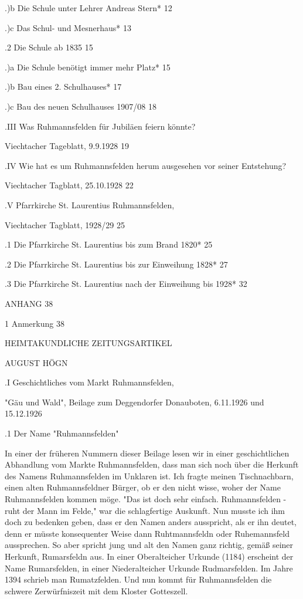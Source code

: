 \documentclass{book}
\begin{document}
.)b Die Schule unter Lehrer Andreas Stern*  12

.)c Das Schul- und Mesnerhaus*  13

.2 Die Schule ab 1835   15

.)a Die Schule benötigt immer mehr Platz*   15

.)b Bau eines 2. Schulhauses*   17

.)c Bau des neuen Schulhauses 1907/08   18

.III Was Ruhmannsfelden für Jubiläen feiern könnte?

Viechtacher Tageblatt, 9.9.1928 19

.IV Wie hat es um Ruhmannsfelden herum ausgesehen vor seiner Entstehung?

Viechtacher Tagblatt, 25.10.1928    22

.V Pfarrkirche St. Laurentius Ruhmannsfelden,

Viechtacher Tagblatt, 1928/29   25

.1 Die Pfarrkirche St. Laurentius bis zum Brand 1820*   25

.2 Die Pfarrkirche St. Laurentius bis zur Einweihung 1828*  27

.3 Die Pfarrkirche St. Laurentius nach der Einweihung bis 1928* 32

ANHANG  38

1 Anmerkung 38



HEIMTAKUNDLICHE ZEITUNGSARTIKEL

AUGUST HÖGN

.I Geschichtliches vom Markt Ruhmannsfelden,

"Gäu und Wald", Beilage zum Deggendorfer Donauboten, 6.11.1926 und 15.12.1926

.1 Der Name "Ruhmannsfelden"

In einer der früheren Nummern dieser Beilage lesen wir in einer geschichtlichen
Abhandlung vom Markte Ruhmannsfelden, dass man sich noch über die Herkunft des
Namens Ruhmannsfelden im Unklaren ist. Ich fragte meinen Tischnachbarn, einen
alten Ruhmannsfeldner Bürger, ob er den nicht wisse, woher der Name
Ruhmannsfelden kommen möge. "Das ist doch sehr einfach. Ruhmannsfelden - ruht
der Mann im Felde," war die schlagfertige Auskunft. Nun musste ich ihm doch zu
bedenken geben, dass er den Namen anders ausspricht, als er ihn deutet, denn er
müsste konsequenter Weise dann Ruhtmannsfeldn oder Ruhemannsfeld aussprechen. So
aber spricht jung und alt den Namen ganz richtig, gemäß seiner Herkunft,
Rumarsfeldn aus. In einer Oberalteicher Urkunde (1184) erscheint der Name
Rumarsfelden, in einer Niederalteicher Urkunde Rudmarsfelden. Im Jahre 1394
schrieb man Rumatzfelden. Und nun kommt für Ruhmannsfelden die schwere
Zerwürfniszeit mit dem Kloster Gotteszell.
\end{document}
